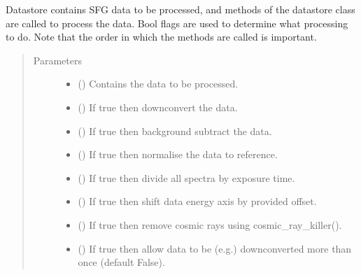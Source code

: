 \documentclass[a4paper,10pt,english]{sphinxmanual}
\begin{document}
\begin{fulllineitems}
\begin{fulllineitems}
\sphinxAtStartPar
Datastore contains SFG data to be processed, and methods of the datastore class are called to
process the data. Bool flags are used to determine what processing to do. Note that the order in
which the methods are called is important.
\begin{quote}\begin{description}
\item[{Parameters}] \leavevmode\begin{itemize}
\item {} 
\sphinxAtStartPar
{} () \textendash{} Contains the data to be processed.

\item {} 
\sphinxAtStartPar
{} () \textendash{} If true then downconvert the data.

\item {} 
\sphinxAtStartPar
{} () \textendash{} If true then background subtract the data.

\item {} 
\sphinxAtStartPar
{} () \textendash{} If true then normalise the data to reference.

\item {} 
\sphinxAtStartPar
{} () \textendash{} If true then divide all spectra by exposure time.

\item {} 
\sphinxAtStartPar
{} () \textendash{} If true then shift data energy axis by provided offset.

\item {} 
\sphinxAtStartPar
{} () \textendash{} If true then remove cosmic rays using cosmic\_ray\_killer().

\item {} 
\sphinxAtStartPar
{} (\sphinxstyleliteralemphasis{\sphinxupquote{, }}) \textendash{} If true then allow data to be (e.g.) downconverted more than once (default False).


\end{itemize}
\end{description}
\end{quote}
\end{fulllineitems}
\end{fulllineitems}
\end{document}
